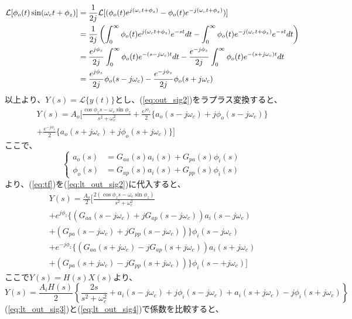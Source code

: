 \documentclass[book]{jlreq}
\begin{document}
%
\begin{align}
    \mathcal{L} [\phi_o(t)\sin(\omega_c t+\phi_z)]
     & = \frac{1}{2j}\mathcal{L}[(\phi_o(t) e^{j(\omega_c t+\phi_z)} - \phi_o(t) e^{-j(\omega_c t+\phi_z)})]\notag \\
     & = \frac{1}{2j}\left(\int_0^\infty \phi_o(t) e^{j(\omega_c t+\phi_z)} e^{-st} dt
    - \int_0^\infty \phi_o(t) e^{-j(\omega_c t+\phi_z)} e^{-st} dt \right)\notag                                   \\
     & = \frac{e^{j\phi_z}}{2j}\int_0^\infty \phi_o(t) e^{-(s-j\omega_c) t} dt
    - \frac{e^{-j\phi_z}}{2j}\int_0^\infty \phi_o(t) e^{-(s+j\omega_c) t} dt\notag                                 \\
     & = \frac{e^{j\phi_z}}{2j}\phi_o(s-j\omega_c) - \frac{e^{-j\phi_z}}{2j} \phi_o(s+j\omega_c)
\end{align}
%
以上より、$Y(s) = \mathcal{L}\{y(t)\}$とし、(\ref{eq:out_sig2})をラプラス変換すると、
%
\begin{multline}
    Y(s) = A_o\biggr [\frac{\cos\phi_z s - \omega_c\sin\phi_z}{s^2+\omega_c^2}
        +  \frac{e^{j\phi_z}}{2}\{a_o(s-j\omega_c) + j \phi_o(s-j\omega_c)\}\\
        + \frac{e^{-j\phi_z}}{2}\{a_o(s+j\omega_c) + j \phi_o(s+j\omega_c)\}\biggl ]
    \label{eq:lt_out_sig2}
\end{multline}
%
ここで、
%
\begin{equation}
    \left\{
    \begin{aligned}
        a_o(s)    & = G_{aa}(s) a_i(s) + G_{pa}(s)\phi_i(s) \\
        \phi_o(s) & = G_{ap}(s) a_i(s) + G_{pp}(s)\phi_i(s)
        \label{eq:tf}
    \end{aligned}
    \right.
\end{equation}
%
より、(\ref{eq:tf})を(\ref{eq:lt_out_sig2})に代入すると、
%
\begin{multline}
    Y(s) = \frac{A_o}{2}\biggr [\frac{2(\cos\phi_z s - \omega_c\sin\phi_z)}{s^2+\omega_c^2}\\
        + e^{j\phi_z}\{(G_{aa}(s-j\omega_c) +j G_{ap}(s-j\omega_c)) a_i(s-j\omega_c)\\
        + (G_{pa}(s-j\omega_c) +j G_{pp}(s-j\omega_c))\} \phi_i(s-j\omega_c)\\
        + e^{-j\phi_z}\{(G_{aa}(s+j\omega_c) -j G_{ap}(s+j\omega_c)) a_i(s+j\omega_c)\\
        + (G_{pa}(s+j\omega_c) -j G_{pp}(s+j\omega_c))\} \phi_i(s-+j\omega_c) \biggl ]
    \label{eq:lt_out_sig3}
\end{multline}
%
ここで$Y(s) = H(s) X(s)$より、
%
\begin{equation}
    Y(s) = \frac{A_i H(s)}{2}\left\{ \frac{2s}{s^2+\omega_c^2}
    + a_i(s-j\omega_c) + j\phi_i(s-j\omega_c)
    + a_i(s+j\omega_c) - j\phi_i(s+j\omega_c) \right\}
    \label{eq:lt_out_sig4}
\end{equation}
%
(\ref{eq:lt_out_sig3})と(\ref{eq:lt_out_sig4})で係数を比較すると、
\end{document}

